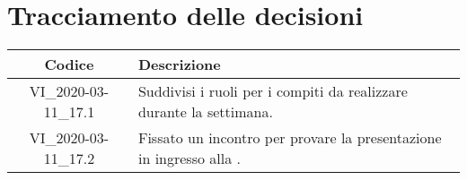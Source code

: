 \section*{Tracciamento delle decisioni}

\begin{center}
	\begin{longtable}{|c|p{12.25cm}|}
	\hline
	\rowcolor{lighter-grayer}
	\textbf{Codice} & \textbf{Descrizione} \\
	\hline
	\endfirsthead
	
	\hline
		VI\_2020-03-11\_17.1 & Suddivisi i ruoli per i compiti da realizzare durante la settimana. \\
	\hline
		VI\_2020-03-11\_17.2 & Fissato un incontro per provare la presentazione in ingresso alla \glock{RP}. \\
	\hline

	\end{longtable}
\end{center}